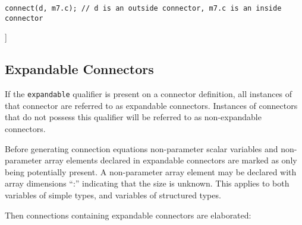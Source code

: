 \begin{lstlisting}[language=modelica]
  connect(d, m7.c); // d is an outside connector, m7.c is an inside connector
\end{lstlisting}
{]}

\subsection{Expandable Connectors}

If the \lstinline!expandable! qualifier is present on a connector definition, all
instances of that connector are referred to as expandable connectors.
Instances of connectors that do not possess this qualifier will be
referred to as non-expandable connectors.

Before generating connection equations non-parameter scalar variables
and non-parameter array elements declared in expandable connectors are
marked as only being potentially present. A non-parameter array element
may be declared with array dimensions ``:'' indicating that the size is
unknown. This applies to both variables of simple types, and variables
of structured types.

Then connections containing expandable connectors are elaborated:

